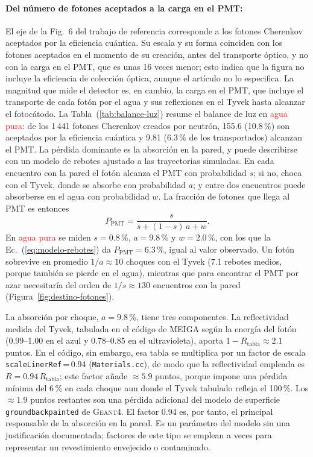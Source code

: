 \paragraph{Del número de fotones aceptados a la carga en el PMT:} El eje de la Fig.~6 del trabajo de referencia corresponde a los fotones Cherenkov aceptados por la eficiencia cuántica. Su escala y su forma coinciden con los fotones aceptados en el momento de su creación, antes del transporte óptico, y no con la carga en el PMT, que es unas 16 veces menor; esto indica que la figura no incluye la eficiencia de colección óptica, aunque el artículo no lo especifica. La magnitud que mide el detector es, en cambio, la carga en el PMT, que incluye el transporte de cada fotón por el agua y sus reflexiones en el Tyvek hasta alcanzar el fotocátodo. La Tabla~(\ref{tab:balance-luz}) resume el balance de luz en \textcolor{red}{agua pura}: de los 1\,441 fotones Cherenkov creados por neutrón, 155.6 (10.8\,\%) son aceptados por la eficiencia cuántica y 9.81 (6.3\,\% de los transportados) alcanzan el PMT. La pérdida dominante es la absorción en la pared, y puede describirse con un modelo de rebotes ajustado a las trayectorias simuladas. En cada encuentro con la pared el fotón alcanza el PMT con probabilidad $s$; si no, choca con el Tyvek, donde se absorbe con probabilidad $a$; y entre dos encuentros puede absorberse en el agua con probabilidad $w$. La fracción de fotones que llega al PMT es entonces
\begin{equation}
	P_{\mathrm{PMT}} = \frac{s}{s+(1-s)\,a+w}.
	\label{eq:modelo-rebotes}
\end{equation}
\noindent En \textcolor{red}{agua pura} se miden $s=0.8$\,\%, $a=9.8$\,\% y $w=2.0$\,\%, con los que la Ec.~(\ref{eq:modelo-rebotes}) da $P_{\mathrm{PMT}}=6.3$\,\%, igual al valor observado. Un fotón sobrevive en promedio $1/a\approx10$ choques con el Tyvek (7.1 rebotes medios, porque también se pierde en el agua), mientras que para encontrar el PMT por azar necesitaría del orden de $1/s\approx130$ encuentros con la pared (Figura~\ref{fig:destino-fotones}).

La absorción por choque, $a=9.8$\,\%, tiene tres componentes. La reflectividad medida del Tyvek, tabulada en el código de MEIGA según la energía del fotón (0.99--1.00 en el azul y 0.78--0.85 en el ultravioleta), aporta $1-R_{\mathrm{tabla}}\approx2.1$ puntos. En el código, sin embargo, esa tabla se multiplica por un factor de escala \texttt{scaleLinerRef}\,=\,0.94 (\texttt{Materials.cc}), de modo que la reflectividad empleada es $R=0.94\,R_{\mathrm{tabla}}$; este factor añade $\approx5.9$ puntos, porque impone una pérdida mínima del 6\,\% en cada choque aun donde el Tyvek tabulado refleja el 100\,\%. Los $\approx1.9$ puntos restantes son una pérdida adicional del modelo de superficie \texttt{groundbackpainted} de \textsc{Geant4}. El factor 0.94 es, por tanto, el principal responsable de la absorción en la pared. Es un parámetro del modelo sin una justificación documentada; factores de este tipo se emplean a veces para representar un revestimiento envejecido o contaminado.

